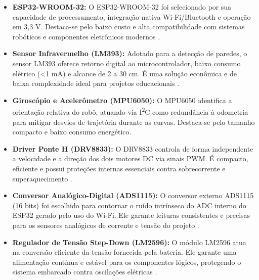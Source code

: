 \begin{itemize}

    \item \textbf{ESP32-WROOM-32:} O ESP32-WROOM-32 foi selecionado por sua capacidade de processamento, integração nativa Wi-Fi/Bluetooth e operação em 3,3 V. Destaca-se pelo baixo custo e alta compatibilidade com sistemas robóticos e componentes eletrônicos modernos \cite{oliveira2024_esp32_roboticar}.

    \item \textbf{Sensor Infravermelho (LM393):} Adotado para a detecção de paredes, o sensor LM393 oferece retorno digital ao microcontrolador, baixo consumo elétrico (<1 mA) e alcance de 2 a 30 cm. É uma solução econômica e de baixa complexidade ideal para projetos educacionais \cite{lima2025_micromouse_lm393}.


    \item \textbf{Giroscópio e Acelerômetro (MPU6050):} O MPU6050 identifica a orientação relativa do robô, atuando via I\textsuperscript{2}C como redundância à odometria para mitigar desvios de trajetória durante as curvas. Destaca-se pelo tamanho compacto e baixo consumo energético.

    \item \textbf{Driver Ponte H (DRV8833):} O DRV8833 controla de forma independente a velocidade e a direção dos dois motores DC via sinais PWM. É compacto, eficiente e possui proteções internas essenciais contra sobrecorrente e superaquecimento \cite{oliveira2024_esp32_roboticar}.

    \item \textbf{Conversor Analógico-Digital (ADS1115):} O conversor externo ADS1115 (16 bits) foi escolhido para contornar o ruído intrínseco do ADC interno do ESP32 gerado pelo uso do Wi-Fi. Ele garante leituras consistentes e precisas para os sensores analógicos de corrente e tensão do projeto \cite{makerhero_ads1115, embarcados_esp32_adc}.

    \item \textbf{Regulador de Tensão Step-Down (LM2596):} O módulo LM2596 atua na conversão eficiente da tensão fornecida pela bateria. Ele garante uma alimentação contínua e estável para os componentes lógicos, protegendo o sistema embarcado contra oscilações elétricas \cite{oliveira2024_esp32_roboticar}.


\end{itemize}
